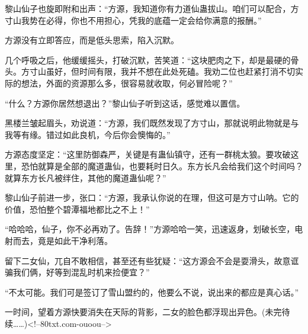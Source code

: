 \begin{this_body}
黎山仙子也旋即附和出声：“方源，我知道你有力道仙蛊拔山。咱们可以配合，方寸山我势在必得，你也不用担心，凭我的底蕴一定会给你满意的报酬。”

方源没有立即答应，而是低头思索，陷入沉默。

几个呼吸之后，他缓缓摇头，打破沉默，苦笑道：“这块肥肉之下，却是最硬的骨头。方寸山虽好，但时间有限，我并不想在此处死磕。我劝二位也赶紧打消不切实际的想法，外面的资源那么多，很容易就收取，何必冒险呢？”

“什么？方源你居然想退出？”黎山仙子听到这话，感觉难以置信。

黑楼兰皱起眉头，劝说道：“方源，我们既然发现了方寸山，那就说明此物就是与我等有缘。错过如此良机，今后你会懊悔的。”

方源态度坚定：“这里防御森严，关键是有蛊仙镇守，还有一群桃太狼。要攻破这里，恐怕就算是全部的魔道蛊仙，也要耗时日久。东方长凡会给我们这个时间吗？就算东方长凡被绊住，其他的魔道蛊仙呢？”

黎山仙子前进一步，张口：“方源，我承认你说的在理，但这可是方寸山呐。它的价值，恐怕整个碧潭福地都比之不上！”

“哈哈哈，仙子，你不必再劝了。告辞！”方源哈哈一笑，迅速返身，划破长空，电射而去，竟是如此干净利落。

留下二女仙，兀自不敢相信，甚至还有些犹疑：“这方源会不会是耍滑头，故意诓骗我们俩，好等到混乱时机来捡便宜？”

“不太可能。我们可是签订了雪山盟约的，他要么不说，说出来的都应是真心话。”

一时间，望着方源快要消失在天际的背影，二女的脸色都浮现出异色。(未完待续……)<!--80txt.com-ouoou-->

\end{this_body}

